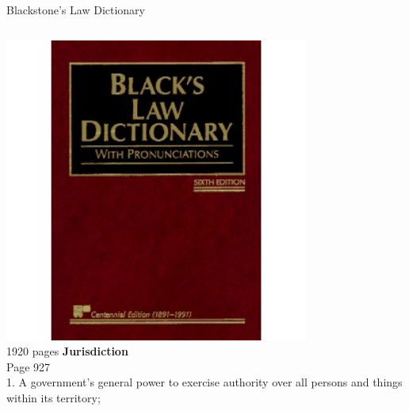\documentclass{beamer}
\begin{document}
\begin{frame}{Blackstone's Law Dictionary}
    \begin{columns}[onlytextwidth]
            \centering
            \includegraphics[width=0.75\textwidth]{img/blacks-law.png}
            \\ { \tiny 1920 pages }
        \textbf{Jurisdiction} \\
        Page 927 \\
        1.  A government's general power to exercise authority over all persons and things within its territory;
    \end{columns}
\end{frame}
\end{document}
